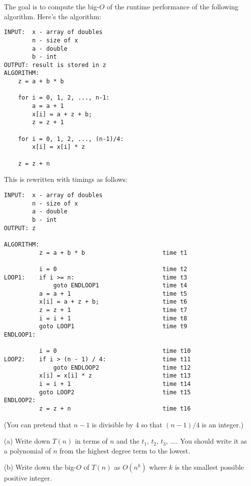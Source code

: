 The goal is to compute the big-$O$ of the runtime performance
of the following algorithm. 
Here's the algorithm:
\begin{Verbatim}[frame=single]
INPUT:  x - array of doubles
        n - size of x
        a - double
        b - int
OUTPUT: result is stored in z
ALGORITHM:
    z = a + b * b                          

    for i = 0, 1, 2, ..., n-1:
        a = a + 1                          
        x[i] = a + z + b;                  
        z = z + 1                          

    for i = 0, 1, 2, ..., (n-1)/4:
        x[i] = x[i] * z                    

    z = z + n                              
\end{Verbatim}
This is rewritten with timings as follows:
\begin{Verbatim}[frame=single]
INPUT:  x - array of doubles
        n - size of x
        a - double
        b - int
OUTPUT: z

ALGORITHM:
          z = a + b * b                      time t1

          i = 0                              time t2
LOOP1:    if i >= n:                         time t3
              goto ENDLOOP1                  time t4 
          a = a + 1                          time t5
          x[i] = a + z + b;                  time t6
          z = z + 1                          time t7
          i = i + 1                          time t8
          goto LOOP1                         time t9
ENDLOOP1:

          i = 0                              time t10
LOOP2:    if i > (n - 1) / 4:                time t11
              goto ENDLOOP2                  time t12
          x[i] = x[i] * z                    time t13
          i = i + 1                          time t14
          goto LOOP2                         time t15
ENDLOOP2:
          z = z + n                          time t16   
\end{Verbatim}

(You can pretend that $n - 1$ is divisible by 4 so that
$(n - 1)/4$ is an integer.)

(a) Write down $T(n)$ in terms of $n$ and the 
$t_1$, $t_2$, $t_3$, ....
You should write it as a polynomial of $n$ from the highest
degree term to the lowest.

(b) Write down the big-$O$ of $T(n)$ as $O(n^k)$
where $k$ is the smallest possible  positive integer.
